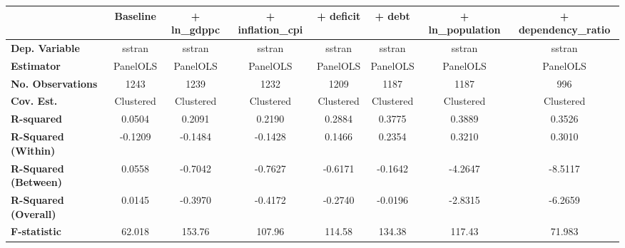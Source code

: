 \begin{center}
\begin{tabular}{lccccccc}
\toprule
                                   & \textbf{Baseline} & \textbf{+ ln\_gdppc} & \textbf{+ inflation\_cpi} & \textbf{+ deficit} & \textbf{+ debt} & \textbf{+ ln\_population} & \textbf{+ dependency\_ratio}  \\
\midrule
\textbf{Dep. Variable}             &       sstran      &        sstran        &           sstran          &       sstran       &      sstran     &           sstran          &            sstran             \\
\textbf{Estimator}                 &      PanelOLS     &       PanelOLS       &          PanelOLS         &      PanelOLS      &     PanelOLS    &          PanelOLS         &           PanelOLS            \\
\textbf{No. Observations}          &        1243       &         1239         &            1232           &        1209        &       1187      &            1187           &             996               \\
\textbf{Cov. Est.}                 &     Clustered     &      Clustered       &         Clustered         &     Clustered      &    Clustered    &         Clustered         &          Clustered            \\
\textbf{R-squared}                 &       0.0504      &        0.2091        &           0.2190          &       0.2884       &      0.3775     &           0.3889          &            0.3526             \\
\textbf{R-Squared (Within)}        &      -0.1209      &       -0.1484        &          -0.1428          &       0.1466       &      0.2354     &           0.3210          &            0.3010             \\
\textbf{R-Squared (Between)}       &       0.0558      &       -0.7042        &          -0.7627          &      -0.6171       &     -0.1642     &          -4.2647          &           -8.5117             \\
\textbf{R-Squared (Overall)}       &       0.0145      &       -0.3970        &          -0.4172          &      -0.2740       &     -0.0196     &          -2.8315          &           -6.2659             \\
\textbf{F-statistic}               &       62.018      &        153.76        &           107.96          &       114.58       &      134.38     &           117.43          &            71.983             \\

\end{tabular}
\end{center}
